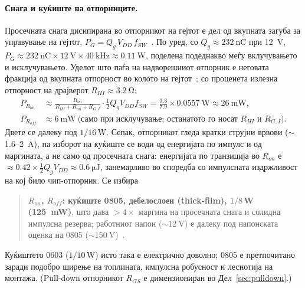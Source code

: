 \documentclass[journal,onecolumn,11pt]{IEEEtran}
\begin{document}
\paragraph{Снага и куќиште на отпорниците.} Просечната снага дисипирана во
отпорникот на гејтот е дел од вкупната загуба за управување на гејтот,
$P_G=Q_g\,V_{DD}\,f_{SW}$~\cite{balogh}. По уред, со $Q_g\approx\SI{232}{\nano\coulomb}$
при \SI{12}{\volt}, $P_G\approx\SI{232}{\nano\coulomb}\times\SI{12}{\volt}\times\SI{40}{\kilo\hertz}\approx\SI{0.11}{\watt}$,
поделена подеднакво меѓу вклучувањето и исклучувањето. Уделот што паѓа на надворешниот
отпорник е неговата фракција од вкупната отпорност во колото на гејтот~\cite{balogh};
со проценета излезна отпорност на драјверот $R_{HI}\approx\SI{3.2}{\ohm}$:
\begin{align}
P_{R_{on}} &\approx\frac{R_{on}}{R_{HI}+R_{on}+R_{G,I}}\cdot\tfrac{1}{2}Q_g V_{DD} f_{SW}
            =\frac{3.3}{7.9}\times\SI{0.0557}{\watt}\approx\SI{26}{\milli\watt},\\
P_{R_{off}} &\approx\SI{6}{\milli\watt}\ \text{(само при исклучување; останатото го носат $R_{HI}$ и $R_{G,I}$).}
\end{align}
Двете се далеку под $1/16$\,W. Сепак, отпорникот гледа кратки струјни врвови
($\sim$\,1.6--\SI{2}{\ampere}), па изборот на куќиште се води од енергијата по импулс
и од маргината, а не само од просечната снага: енергијата по транзиција во $R_{on}$
е $\approx 0.42\times\tfrac{1}{2}Q_g V_{DD}\approx\SI{0.6}{\micro\joule}$, занемарливо
во споредба со импулсната издржливост на кој било чип-отпорник. Се избира
\begin{quote}
\textbf{$R_{on}$, $R_{off}$: куќиште 0805, дебелослоен (thick-film), $1/8$\,W
(\SI{125}{\milli\watt})}, што дава $>4\times$ маргина на просечната снага и солидна
импулсна резерва; работниот напон ($\sim\SI{12}{\volt}$) е далеку под напонската
оценка на 0805 ($\sim\SI{150}{\volt}$)~\cite{balogh}.
\end{quote}
Куќиштето 0603 ($1/10$\,W) исто така е електрично доволно; 0805 е претпочитано заради
подобро ширење на топлината, импулсна робусност и леснотија на монтажа. (Pull-down
отпорникот $R_{GS}$ е димензиониран во Дел~\ref{sec:pulldown}.)
\end{document}
